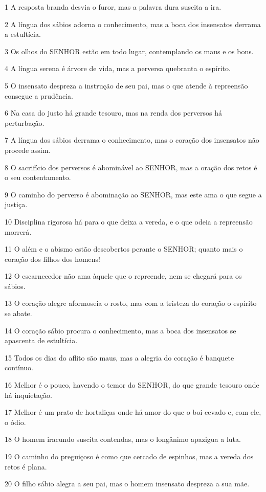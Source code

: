 \par 1 A resposta branda desvia o furor, mas a palavra dura suscita a ira.
\par 2 A língua dos sábios adorna o conhecimento, mas a boca dos insensatos derrama a estultícia.
\par 3 Os olhos do SENHOR estão em todo lugar, contemplando os maus e os bons.
\par 4 A língua serena é árvore de vida, mas a perversa quebranta o espírito.
\par 5 O insensato despreza a instrução de seu pai, mas o que atende à repreensão consegue a prudência.
\par 6 Na casa do justo há grande tesouro, mas na renda dos perversos há perturbação.
\par 7 A língua dos sábios derrama o conhecimento, mas o coração dos insensatos não procede assim.
\par 8 O sacrifício dos perversos é abominável ao SENHOR, mas a oração dos retos é o seu contentamento.
\par 9 O caminho do perverso é abominação ao SENHOR, mas este ama o que segue a justiça.
\par 10 Disciplina rigorosa há para o que deixa a vereda, e o que odeia a repreensão morrerá.
\par 11 O além e o abismo estão descobertos perante o SENHOR; quanto mais o coração dos filhos dos homens!
\par 12 O escarnecedor não ama àquele que o repreende, nem se chegará para os sábios.
\par 13 O coração alegre aformoseia o rosto, mas com a tristeza do coração o espírito se abate.
\par 14 O coração sábio procura o conhecimento, mas a boca dos insensatos se apascenta de estultícia.
\par 15 Todos os dias do aflito são maus, mas a alegria do coração é banquete contínuo.
\par 16 Melhor é o pouco, havendo o temor do SENHOR, do que grande tesouro onde há inquietação.
\par 17 Melhor é um prato de hortaliças onde há amor do que o boi cevado e, com ele, o ódio.
\par 18 O homem iracundo suscita contendas, mas o longânimo apazigua a luta.
\par 19 O caminho do preguiçoso é como que cercado de espinhos, mas a vereda dos retos é plana.
\par 20 O filho sábio alegra a seu pai, mas o homem insensato despreza a sua mãe.
